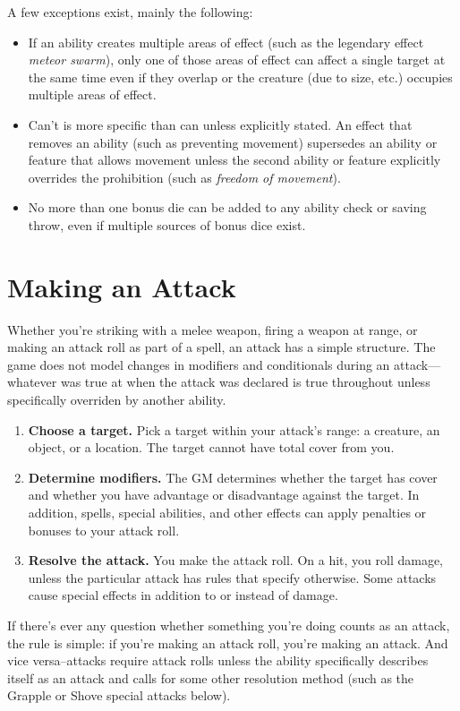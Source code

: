 A few exceptions exist, mainly the following:
\begin{itemize}
\item If an ability creates multiple areas of effect (such as the legendary effect \textit{meteor swarm}), only one of those areas of effect can affect a single target at the same time even if they overlap or the creature (due to size, etc.) occupies multiple areas of effect.
\item Can't is more specific than can unless explicitly stated. An effect that removes an ability (such as preventing movement) supersedes an ability or feature that allows movement unless the second ability or feature explicitly overrides the prohibition (such as \textit{freedom of movement}).
\item No more than one bonus die can be added to any ability check or saving throw, even if multiple sources of bonus dice exist.
\end{itemize}

\section{Making an Attack}\label{sec:making-an-attack}

Whether you're striking with a melee weapon, firing a weapon at range, or making an attack roll as part of a spell, an attack has a simple structure. The game does not model changes in modifiers and conditionals during an attack---whatever was true at when the attack was declared is true throughout unless specifically overriden by another ability.

\begin{enumerate}
\item \textbf{Choose a target.} Pick a target within your attack's range: a creature, an object, or a location. The target cannot have total cover from you.
\item \textbf{Determine modifiers.} The GM determines whether the target has cover and whether you have advantage or disadvantage against the target. In addition, spells, special abilities, and other effects can apply penalties or bonuses to your attack roll.
\item \textbf{Resolve the attack.} You make the attack roll. On a hit, you roll damage, unless the particular attack has rules that specify otherwise. Some attacks cause special effects in addition to or instead of damage.
\end{enumerate}

If there's ever any question whether something you're doing counts as an attack, the rule is simple: if you're making an attack roll, you're making an attack. And vice versa--attacks require attack rolls unless the ability specifically describes itself as an attack and calls for some other resolution method (such as the Grapple or Shove special attacks below).

